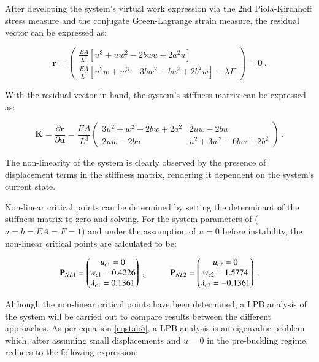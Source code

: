 After developing the system's virtual work expression via the 2nd Piola-Kirchhoff stress measure and the conjugate Green-Lagrange strain measure, the residual vector can be expressed as:

\begin{equation} 
\mathbf{r} = 
\begin{pmatrix}
\frac{EA}{L^3} [u^3+uw^2-2bwu+2a^2u] \\
\frac{EA}{L^3} [u^2w + w^3 - 3bw^2 - bu^2 +2b^2w] - \lambda F
\end{pmatrix}
=
\mathbf{0}
\label{eqstab6}\ .
\end{equation}

With the residual vector in hand, the system's stiffness matrix can be expressed as:

\begin{equation} 
\mathbf{K} = 
\frac{\partial \mathbf{r}}{\partial \mathbf{u}}
=
\frac{EA}{L^3}
\begin{pmatrix}
3u^2 + w^2 - 2bw +2a^2 & 2uw -2bu \\
2uw - 2bu & u^2 + 3w^2 - 6bw + 2b^2
\end{pmatrix}
\label{eqstab7}\ .
\end{equation}

The non-linearity of the system is clearly observed by the presence of displacement terms in the stiffness matrix, rendering it dependent on the system's current state.

Non-linear critical points can be determined by setting the determinant of the stiffness matrix to zero and solving. For the system parameters of ($a=b=EA=F=1$) and under the assumption of $u = 0$ before instability, the non-linear critical points are calculated to be:

 \begin{equation} 
\mathbf{P}_{NL1} = 
 \begin{pmatrix}
 u_{c1} = 0 \\
w_{c1} = 0.4226 \\
\lambda_{c1} = 0.1361
 \end{pmatrix}
 \ ,
 \hspace{10mm}
 \mathbf{P}_{NL2} = 
 \begin{pmatrix}
 u_{c2} = 0 \\
 w_{c2} = 1.5774 \\
 \lambda_{c2} = -0.1361
 \end{pmatrix}
 \label{eqstab8}\ .
 \end{equation}
 
Although the non-linear critical points have been determined, a LPB analysis of the system will be carried out to compare results between the different approaches. As per equation \ref{eqstab5}, a LPB analysis is an eigenvalue problem which, after assuming small displacements and $u=0$ in the pre-buckling regime, reduces to the following expression:

